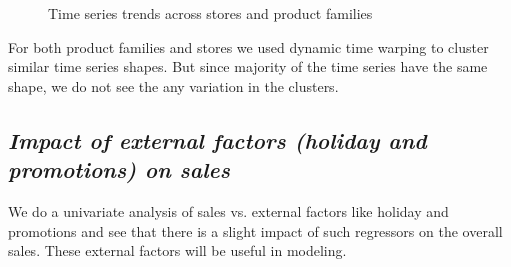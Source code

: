 \documentclass[12pt,a4paper]{cibb}
\begin{document}
\begin{figure}[h]
\hfill
{}
\hfill
{}
\hfill
\caption{Time series trends across stores and product families}
\end{figure}

For both product families and stores we used dynamic time warping to cluster similar time series shapes. But since majority of the time series have the same shape, we do not see the any variation in the clusters.

\subsection{\bf \it Impact of external factors (holiday and promotions) on sales}
We do a univariate analysis of sales vs. external factors like holiday and promotions and see that there is a slight impact of such regressors on the overall sales. These external factors will be useful in modeling.
\end{document}
